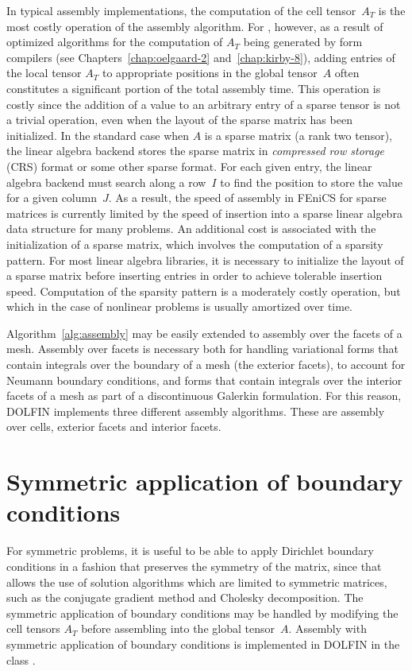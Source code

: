 In typical assembly implementations, the computation of the
cell tensor~$A_T$ is the most costly operation of the assembly
algorithm. For \dolfin{}, however, as a result of optimized algorithms
for the computation of $A_T$ being generated by form compilers (see
Chapters~\ref{chap:oelgaard-2} and~\ref{chap:kirby-8}), adding entries of
the local tensor $A_T$ to appropriate positions in the global tensor~$A$
often constitutes a significant portion of the total assembly time. This
operation is costly since the addition of a value to an arbitrary entry
of a sparse tensor is not a trivial operation, even when the layout of
the sparse matrix has been initialized.  In the standard case when $A$
is a sparse matrix (a rank two tensor), the linear algebra backend stores
the sparse matrix in \emph{compressed row storage} (CRS) format or some
other sparse format. For each given entry, the linear algebra backend
must search along a row~$I$ to find the position to store the value for
a given column~$J$. As a result, the speed of assembly in FEniCS for
sparse matrices is currently limited by the speed of insertion into a
sparse linear algebra data structure for many problems. An additional
cost is associated with the initialization of a sparse matrix, which
involves the computation of a sparsity pattern. For most linear algebra
libraries, it is necessary to initialize the layout of a sparse matrix
before inserting entries in order to achieve tolerable insertion speed.
Computation of the sparsity pattern is a moderately costly operation,
but which in the case of nonlinear problems is usually amortized over time.

Algorithm~\ref{alg:assembly} may be easily extended to assembly over
the facets of a mesh. Assembly over facets is necessary both for
handling variational forms that contain integrals over the boundary of
a mesh (the exterior facets), to account for Neumann boundary
conditions, and forms that contain integrals over the interior facets
of a mesh as part of a discontinuous Galerkin formulation. For this
reason, DOLFIN implements three different assembly algorithms. These
are assembly over cells, exterior facets and interior facets.

\section{Symmetric application of boundary conditions}

For symmetric problems, it is useful to be able to apply Dirichlet
boundary conditions in a fashion that preserves the symmetry of the
matrix, since that allows the use of solution algorithms which are
limited to symmetric matrices, such as the conjugate gradient method
and Cholesky decomposition. The symmetric application of boundary
conditions may be handled by modifying the cell tensors $A_T$ before
assembling into the global tensor~$A$. Assembly with symmetric
application of boundary conditions is implemented in DOLFIN in the
class .

